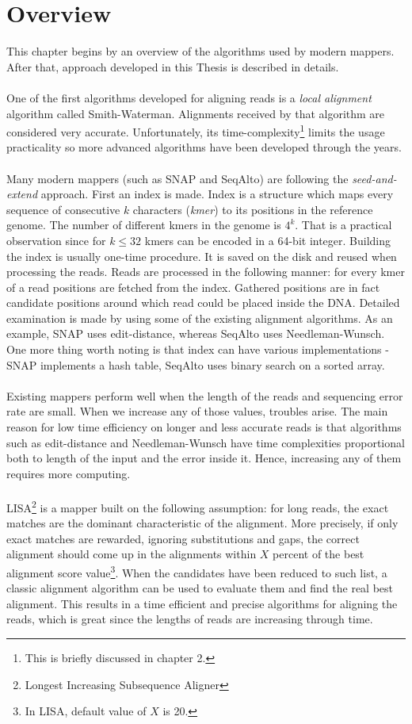 \documentclass[times, utf8, diplomski]{fer}
\begin{document}
\section{Overview}
This chapter begins by an overview of the algorithms used by modern mappers. After that, approach developed in this Thesis is described in details.\\
\\
One of the first algorithms developed for aligning reads is a \emph{local alignment} algorithm called Smith-Waterman\cite{Smith1981195}. Alignments received by that algorithm are considered very accurate. Unfortunately, its time-complexity\footnote{This is briefly discussed in chapter 2.} limits the usage practicality so more advanced algorithms have been developed through the years.\\
\\
Many modern mappers (such as SNAP\cite{SNAP} and SeqAlto\cite{seqalto}) are following the \emph{seed-and-extend} approach. First an index is made. Index is a structure which maps every sequence of consecutive $k$ characters (\emph{kmer}) to its positions in the reference genome. The number of different kmers in the genome is $4^k$. That is a practical observation since for $k \le 32$ kmers can be encoded in a 64-bit integer. Building the index is usually one-time procedure. It is saved on the disk and reused when processing the reads. Reads are processed in the following manner: for every kmer of a read positions are fetched from the index. Gathered positions are in fact candidate positions around which read could be placed inside the DNA. Detailed examination is made by using some of the existing alignment algorithms. As an example, SNAP uses edit-distance, whereas SeqAlto uses Needleman-Wunsch. One more thing worth noting is that index can have various implementations - SNAP implements a hash table, SeqAlto uses binary search on a sorted array.\\
\\
Existing mappers perform well when the length of the reads and sequencing error rate are small. When we increase any of those values, troubles arise. The main reason for low time efficiency on longer and less accurate reads is that algorithms such as edit-distance and Needleman-Wunsch have time complexities proportional both to length of the input and the error inside it. Hence, increasing any of them requires more computing.\\
\\
LISA\footnote{Longest Increasing Subsequence Aligner} is a mapper built on the following assumption: for long reads, the exact matches are the dominant characteristic of the alignment. More precisely, if only exact matches are rewarded, ignoring substitutions and gaps, the correct alignment should come up in the alignments within $X$ percent of the best alignment score value\footnote{In LISA, default value of $X$ is 20.}. When the candidates have been reduced to such list, a classic alignment algorithm can be used to evaluate them and find the real best alignment. This results in a time efficient and precise algorithms for aligning the reads, which is great since the lengths of reads are increasing through time.
\end{document}
